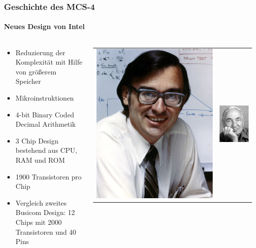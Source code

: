 \begin{frame}
	\frametitle{Geschichte des MCS-4}
	\framesubtitle{Neues Design von Intel}
	\begin{columns}[c]
		\begin{column}{.5\textwidth}
			\begin{itemize}
				\item Reduzierung der Komplexität mit Hilfe von größerem Speicher
				\item Mikroinstruktionen
				\item 4-bit Binary Coded Decimal Arithmetik
				\item 3 Chip Design bestehend aus CPU, RAM und ROM
				\item 1900 Transistoren pro Chip
				\item Vergleich zweites Busicom Design: 12 Chips mit 2000 Transistoren und 40 Pins
			\end{itemize}
		\end{column}
		\begin{column}{.5\textwidth}
			\begin{table}[h]
				\begin{tabular}{cc}
					\includegraphics[width=0.35\linewidth]{images/hoff.jpeg}
					& 	
					\includegraphics[width=0.35\linewidth]{images/mazor.jpg}
					\\

\end{tabular}
\end{table}
\end{column}
\end{columns}
\end{frame}
